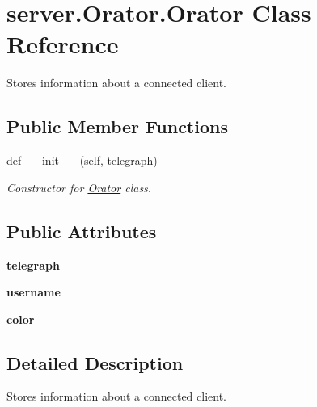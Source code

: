 \hypertarget{classserver_1_1Orator_1_1Orator}{}\section{server.\+Orator.\+Orator Class Reference}
\label{classserver_1_1Orator_1_1Orator}


Stores information about a connected client.  


\subsection*{Public Member Functions}
\begin{DoxyCompactItemize}
\item 
def \hyperlink{classserver_1_1Orator_1_1Orator_a173c8497b251bba46514f28e089597eb}{\+\_\+\+\_\+init\+\_\+\+\_\+} (self, telegraph)
\begin{DoxyCompactList}\small\item\em Constructor for \hyperlink{classserver_1_1Orator_1_1Orator}{Orator} class. \end{DoxyCompactList}\end{DoxyCompactItemize}
\subsection*{Public Attributes}
\begin{DoxyCompactItemize}
\item 
{\bfseries telegraph}\hypertarget{classserver_1_1Orator_1_1Orator_a87ae5421efc0e5f4ccce21d04cb921f4}{}\label{classserver_1_1Orator_1_1Orator_a87ae5421efc0e5f4ccce21d04cb921f4}

\item 
{\bfseries username}\hypertarget{classserver_1_1Orator_1_1Orator_a644ae940ba661f69b721deb635549f21}{}\label{classserver_1_1Orator_1_1Orator_a644ae940ba661f69b721deb635549f21}

\item 
{\bfseries color}\hypertarget{classserver_1_1Orator_1_1Orator_a1a5fc663a1e5aaa7d58fbcf05829d882}{}\label{classserver_1_1Orator_1_1Orator_a1a5fc663a1e5aaa7d58fbcf05829d882}

\end{DoxyCompactItemize}


\subsection{Detailed Description}
Stores information about a connected client. 

